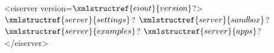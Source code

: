 <eiserver version=$\xmlstructref{eiout}{version}$?>
  $\xmlstructref{server}{settings}$?
  $\xmlstructref{server}{sandbox}$?
  $\xmlstructref{server}{examples}$?
  $\xmlstructref{server}{apps}$?
</eiserver>

